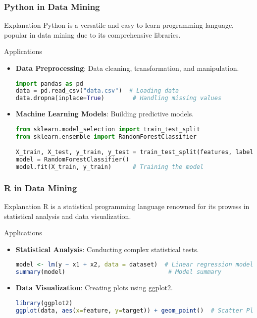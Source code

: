 \documentclass[aspectratio=169]{beamer}
\begin{document}
\begin{frame}[fragile]
    \frametitle{Python in Data Mining}
    \begin{block}{Explanation}
    Python is a versatile and easy-to-learn programming language, popular in data mining due to its comprehensive libraries.
    \end{block}
    
    \begin{block}{Applications}
        \begin{itemize}
            \item \textbf{Data Preprocessing}: Data cleaning, transformation, and manipulation.
            \begin{lstlisting}[language=Python]
import pandas as pd
data = pd.read_csv("data.csv")  # Loading data
data.dropna(inplace=True)        # Handling missing values
            \end{lstlisting}
            
            \item \textbf{Machine Learning Models}: Building predictive models.
            \begin{lstlisting}[language=Python]
from sklearn.model_selection import train_test_split
from sklearn.ensemble import RandomForestClassifier

X_train, X_test, y_train, y_test = train_test_split(features, labels, test_size=0.2)
model = RandomForestClassifier()
model.fit(X_train, y_train)      # Training the model
            \end{lstlisting}
        \end{itemize}
    \end{block}
\end{frame}

\begin{frame}[fragile]
    \frametitle{R in Data Mining}
    \begin{block}{Explanation}
    R is a statistical programming language renowned for its prowess in statistical analysis and data visualization.
    \end{block}
    
    \begin{block}{Applications}
        \begin{itemize}
            \item \textbf{Statistical Analysis}: Conducting complex statistical tests.
            \begin{lstlisting}[language=R]
model <- lm(y ~ x1 + x2, data = dataset)  # Linear regression model
summary(model)                             # Model summary
            \end{lstlisting}

            \item \textbf{Data Visualization}: Creating plots using ggplot2.
            \begin{lstlisting}[language=R]
library(ggplot2)
ggplot(data, aes(x=feature, y=target)) + geom_point()  # Scatter Plot
            \end{lstlisting}
        \end{itemize}
    \end{block}
\end{frame}
\end{document}
